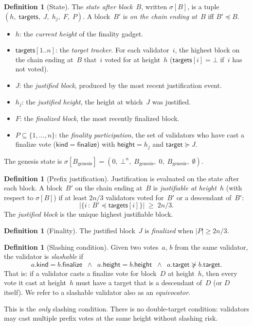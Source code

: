 \documentclass{article}
\newcommand{\target}{\mathsf{target}}
\newcommand{\targets}{\mathsf{targets}}
\newcommand{\kind}{\mathsf{kind}}
\newcommand{\height}{\mathsf{height}}
\newcommand{\finalize}{\mathsf{finalize}}
\theoremstyle{plain}
\theoremstyle{definition}
\newtheorem{definition}[theorem]{Definition}
\theoremstyle{remark}
\begin{document}
\begin{definition}[State]\label{def:state}
The \emph{state after block~$B$}, written $\sigma[B]$, is a tuple $(h,\; \targets,\; J,\; h_j,\; F,\; P)$.
A block~$B'$ is \emph{on the chain ending at~$B$} iff $B' \preceq B$.
\begin{itemize}
  \item $h$: the \emph{current height} of the finality gadget.
  \item $\targets[1..n]$: the \emph{target tracker}.
        For each validator~$i$, the highest block on the chain ending at~$B$ that~$i$ voted for at height~$h$
        ($\targets[i] = \bot$ if~$i$ has not voted).
  \item $J$: the \emph{justified block}, produced by the most recent justification event.
  \item $h_j$: the \emph{justified height}, the height at which~$J$ was justified.
  \item $F$: the \emph{finalized block}, the most recently finalized block.
  \item $P \subseteq \{1, \ldots, n\}$: the \emph{finality participation}, the set of validators who have cast a finalize vote ($\kind = \finalize$) with $\height = h_j$ and $\target \succeq J$.
\end{itemize}
The genesis state is $\sigma[B_{\mathrm{genesis}}] = (0,\; \bot^n,\; B_{\mathrm{genesis}},\; 0,\; B_{\mathrm{genesis}},\; \emptyset)$.
\end{definition}

\begin{definition}[Prefix justification]\label{def:justification}
Justification is evaluated on the state after each block.
A block~$B'$ on the chain ending at~$B$ is \emph{justifiable at height~$h$} (with respect to $\sigma[B]$) if at least $2n/3$ validators voted for~$B'$ or a descendant of~$B'$:
\[
  \bigl|\{i \,:\, B' \preceq \targets[i]\}\bigr| \;\geq\; 2n/3.
\]
The \emph{justified block} is the unique highest justifiable block.
\end{definition}

\begin{definition}[Finality]\label{def:finality}
The justified block~$J$ is \emph{finalized} when $|P| \geq 2n/3$.
\end{definition}

\begin{definition}[Slashing condition]\label{def:slashing}
Given two votes~$a$, $b$ from the same validator, the validator is \emph{slashable} if
\[
  a.\kind = b.\finalize
  \;\;\wedge\;\;
  a.\height = b.\height
  \;\;\wedge\;\;
  a.\target  \not\succeq b.\target.
\]
That is: if a validator casts a finalize vote for block~$D$ at height~$h$, then every vote it cast at height~$h$ must have a target that is a descendant of~$D$ (or $D$ itself).
We refer to a slashable validator also as an \emph{equivocator}.

This is the \emph{only} slashing condition.
There is no double-target condition: validators may cast multiple prefix votes at the same height without slashing risk.
\end{definition}
\end{document}

